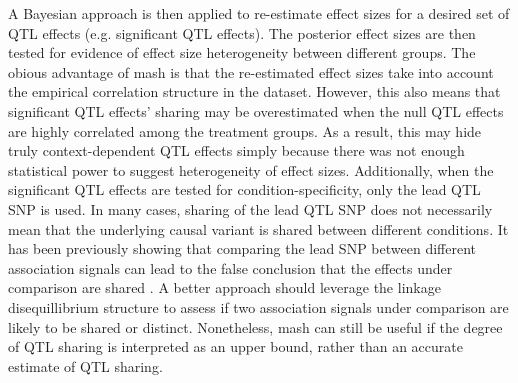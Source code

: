 A Bayesian approach is then applied to re-estimate effect sizes for a desired set of QTL effects (e.g. significant QTL effects). The posterior effect sizes are then tested for evidence of effect size heterogeneity between different groups. The obious advantage of mash is that the re-estimated effect sizes take into account the empirical correlation structure in the dataset. However, this also means that significant QTL effects' sharing may be overestimated when the null QTL effects are highly correlated among the treatment groups. As a result, this may hide truly context-dependent QTL effects simply because there was not enough statistical power to suggest heterogeneity of effect sizes. Additionally, when the significant QTL effects are tested for condition-specificity, only the lead QTL SNP is used. In many cases, sharing of the lead QTL SNP does not necessarily mean that the underlying causal variant is shared between different conditions. It has been previously showing that comparing the lead SNP between different association signals can lead to the false conclusion that the effects under comparison are shared \cite{Liu2019-fv}. A better approach should leverage the linkage disequillibrium structure to assess if two association signals under comparison are likely to be shared or distinct. Nonetheless, mash can still be useful if the degree of QTL sharing is interpreted as an upper bound, rather than an accurate estimate of QTL sharing.\\


